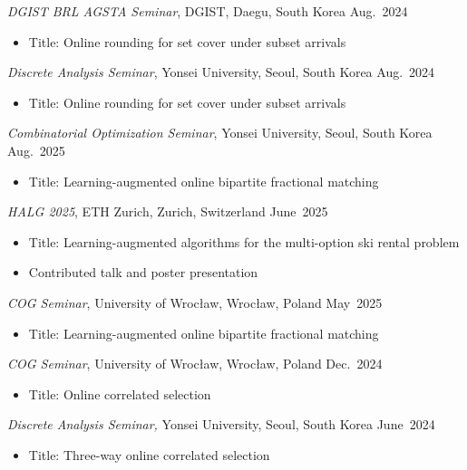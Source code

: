 \documentclass{article}
\newcommand{\killinitspace}{-0.7em}
\begin{document}
\textsl{DGIST BRL AGSTA Seminar}, DGIST, Daegu, South Korea \hfill Aug.~2024
\vspace{\killinitspace}
\begin{itemize}
\item Title: Online rounding for set cover under subset arrivals
\end{itemize}

\textsl{Discrete Analysis Seminar}, Yonsei University, Seoul, South Korea \hfill Aug.~2024
\vspace{\killinitspace}
\begin{itemize}
\item Title: Online rounding for set cover under subset arrivals
\end{itemize}

\textsl{Combinatorial Optimization Seminar}, Yonsei University, Seoul, South Korea  \hfill Aug.~2025
\vspace{\killinitspace}
\begin{itemize}
\item Title: Learning-augmented online bipartite fractional matching
\end{itemize}

\textsl{HALG 2025}, ETH Zurich, Zurich, Switzerland \hfill June~2025
\vspace{\killinitspace}
\begin{itemize}
\item Title: Learning-augmented algorithms for the multi-option ski rental problem
\item Contributed talk and poster presentation
\end{itemize}

\textsl{COG Seminar}, University of Wrocław, Wrocław, Poland  \hfill May~2025
\vspace{\killinitspace}
\begin{itemize}
\item Title: Learning-augmented online bipartite fractional matching
\end{itemize}

\textsl{COG Seminar}, University of Wrocław, Wrocław, Poland  \hfill Dec.~2024
\vspace{\killinitspace}
\begin{itemize}
\item Title: Online correlated selection
\end{itemize}

\textsl{Discrete Analysis Seminar,} Yonsei University, Seoul, South Korea \hfill June~2024
\vspace{\killinitspace}
\begin{itemize}
\item Title: Three-way online correlated selection
\end{itemize}
\end{document}
